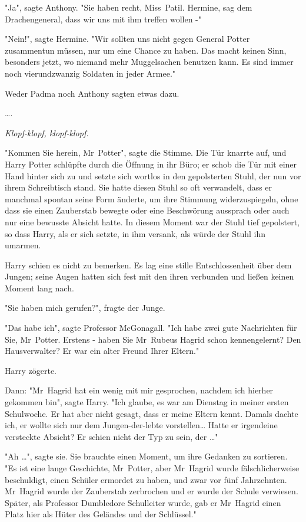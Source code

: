 {"Ja", sagte Anthony. "Sie haben recht, Miss~Patil. Hermine, sag dem Drachengeneral, dass wir uns mit ihm treffen wollen -"

"Nein!", sagte Hermine. "Wir sollten uns nicht gegen General Potter zusammentun müssen, nur um eine Chance zu haben. Das macht keinen Sinn, besonders jetzt, wo niemand mehr Muggelsachen benutzen kann. Es sind immer noch vierundzwanzig Soldaten in jeder Armee."

Weder Padma noch Anthony sagten etwas dazu.

….

\emph{Klopf-klopf, klopf-klopf.}

"Kommen Sie herein, Mr~Potter", sagte die Stimme. Die Tür knarrte auf, und Harry Potter schlüpfte durch die Öffnung in ihr Büro; er schob die Tür mit einer Hand hinter sich zu und setzte sich wortlos in den gepolsterten Stuhl, der nun vor ihrem Schreibtisch stand. Sie hatte diesen Stuhl so oft verwandelt, dass er manchmal spontan seine Form änderte, um ihre Stimmung widerzuspiegeln, ohne dass sie einen Zauberstab bewegte oder eine Beschwörung aussprach oder auch nur eine bewusste Absicht hatte. In diesem Moment war der Stuhl tief gepolstert, so dass Harry, als er sich setzte, in ihm versank, als würde der Stuhl ihn umarmen.

Harry schien es nicht zu bemerken. Es lag eine stille Entschlossenheit über dem Jungen; seine Augen hatten sich fest mit den ihren verbunden und ließen keinen Moment lang nach.

"Sie haben mich gerufen?", fragte der Junge.

"Das habe ich", sagte Professor McGonagall. "Ich habe zwei gute Nachrichten für Sie, Mr~Potter. Erstens - haben Sie Mr~Rubeus Hagrid schon kennengelernt? Den Hausverwalter? Er war ein alter Freund Ihrer Eltern."

Harry zögerte.

Dann: "Mr~Hagrid hat ein wenig mit mir gesprochen, nachdem ich hierher gekommen bin", sagte Harry. "Ich glaube, es war am Dienstag in meiner ersten Schulwoche. Er hat aber nicht gesagt, dass er meine Eltern kennt. Damals dachte ich, er wollte sich nur dem Jungen-der-lebte vorstellen… Hatte er irgendeine versteckte Absicht? Er schien nicht der Typ zu sein, der …"

"Ah …", sagte sie. Sie brauchte einen Moment, um ihre Gedanken zu sortieren. "Es ist eine lange Geschichte, Mr~Potter, aber Mr~Hagrid wurde fälschlicherweise beschuldigt, einen Schüler ermordet zu haben, und zwar vor fünf Jahrzehnten. Mr~Hagrid wurde der Zauberstab zerbrochen und er wurde der Schule verwiesen. Später, als Professor Dumbledore Schulleiter wurde, gab er Mr~Hagrid einen Platz hier als Hüter des Geländes und der Schlüssel."

}
